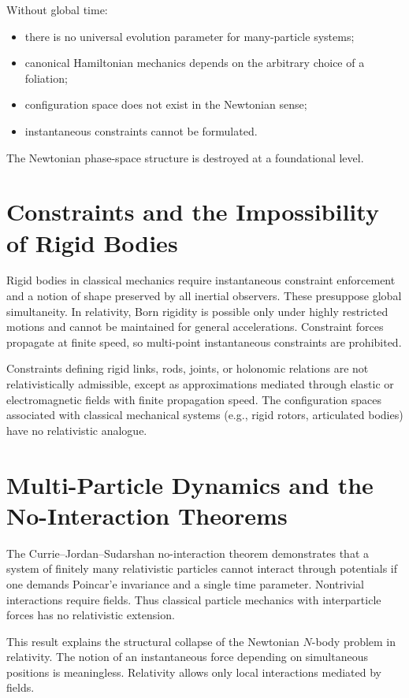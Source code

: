 \documentclass[12pt]{article}
\begin{document}
Without global time:
\begin{itemize}
    \item there is no universal evolution parameter for many-particle systems;
    \item canonical Hamiltonian mechanics depends on the arbitrary choice of a foliation;
    \item configuration space does not exist in the Newtonian sense;
    \item instantaneous constraints cannot be formulated.
\end{itemize}

The Newtonian phase-space structure is destroyed at a foundational level.

\section{Constraints and the Impossibility of Rigid Bodies}
Rigid bodies in classical mechanics require instantaneous constraint enforcement and a notion of shape preserved by all inertial observers. These presuppose global simultaneity. In relativity, Born rigidity is possible only under highly restricted motions and cannot be maintained for general accelerations. Constraint forces propagate at finite speed, so multi-point instantaneous constraints are prohibited.

Constraints defining rigid links, rods, joints, or holonomic relations are not relativistically admissible, except as approximations mediated through elastic or electromagnetic fields with finite propagation speed. The configuration spaces associated with classical mechanical systems (e.g., rigid rotors, articulated bodies) have no relativistic analogue.

\section{Multi-Particle Dynamics and the No-Interaction Theorems}
The Currie--Jordan--Sudarshan no-interaction theorem demonstrates that a system of finitely many relativistic particles cannot interact through potentials if one demands Poincar'e invariance and a single time parameter. Nontrivial interactions require fields. Thus classical particle mechanics with interparticle forces has no relativistic extension.

This result explains the structural collapse of the Newtonian $N$-body problem in relativity. The notion of an instantaneous force depending on simultaneous positions is meaningless. Relativity allows only local interactions mediated by fields.
\end{document}
